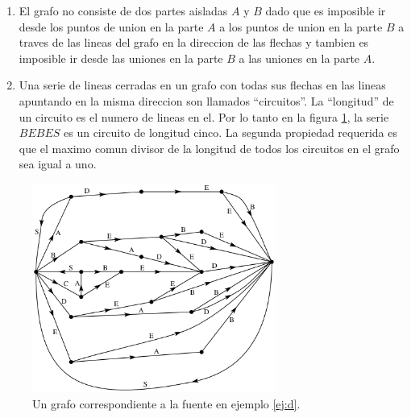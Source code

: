 \begin{enumerate}
  \item El grafo no consiste de dos partes aisladas $A$ y $B$ dado que
    es imposible ir desde los puntos de union en la parte $A$ a los
    puntos de union en la parte $B$ a traves de las lineas del grafo
    en la direccion de las flechas y tambien es imposible ir desde las
    uniones en la parte $B$ a las uniones en la parte $A$.
 \item Una serie de lineas cerradas en un grafo con todas sus flechas
   en las lineas apuntando en la misma direccion son llamados
   ``circuitos''.  La ``longitud'' de un circuito es el numero de
   lineas en el.  Por lo tanto en la figura \ref{fig:5}, la serie $BEBES$ es
   un circuito de longitud cinco.  La segunda propiedad requerida es
   que el maximo comun divisor de la longitud de todos los circuitos
   en el grafo sea igual a uno.
\end{enumerate}

\begin{figure}[!ht]
\centerline{\includegraphics[width=80mm]{Imagenes/SinComentarios/Pagina9-Figura5.png}}
\caption{Un grafo correspondiente a la fuente en ejemplo \ref{ej:d}.}
\label{fig:5}
\end{figure}

